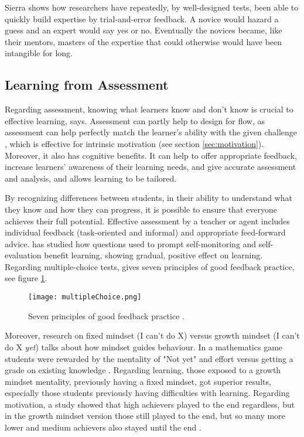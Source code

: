   Sierra shows how researchers have repeatedly, by well-designed tests, been able to quickly build expertise by trial-and-error feedback. A novice would hazard a guess and an expert would say yes or no. Eventually the novices became, like their mentors, masters of the expertise that could otherwise would have been intangible for long.

  \subsection{Learning from Assessment}\label{learning-assessment}

  Regarding assessment, knowing what learners know and don't know is crucial to effective learning, \cite{luckin} says. Assessment can partly help to design for flow, as assessment can help perfectly match the learner's ability with the given challenge \citep{bruhlmann}, which is effective for intrinsic motivation (see section \ref{sec:motivation}). Moreover, it also has cognitive benefits. It can help to offer appropriate feedback, increase learners' awareness of their learning needs, and give accurate assessment and analysis, and allows learning to be tailored.

  By recognizing differences between students, in their ability to understand what they know and how they can progress, it is possible to ensure that everyone achieves their full potential. Effective assessment by a teacher or agent includes individual feedback (task-oriented and informal) and appropriate feed-forward advice. \cite{sitzmann} has studied how questions used to prompt self-monitoring and self-evaluation benefit learning, showing gradual, positive  effect on learning. Regarding multiple-choice tests, \cite{nicol} gives seven principles of good feedback practice, see figure \ref{fig:multiple-choice}.

  \begin{figure}[h]
    \centering
    \texttt{[image: multipleChoice.png]}
    \caption{Seven principles of good feedback practice \cite{nicol}.}
    \label{fig:multiple-choice}
\end{figure}

  Moreover, research on fixed mindset (I can't do X) versus growth mindset (I can't do X \textit{yet}) talks about how mindset guides behaviour. In a mathematics game students were rewarded by the mentality of "Not yet" and effort versus getting a grade on existing knowledge \citep{dweck}. Regarding learning, those exposed to a growth mindset mentality, previously having a fixed mindset, got superior results, especially those students previously having difficulties with learning. Regarding motivation, a study showed that high achievers played to the end regardless, but in the growth mindset version those still played to the end, but so many more lower and medium achievers also stayed until the end \citep{dweck}.

